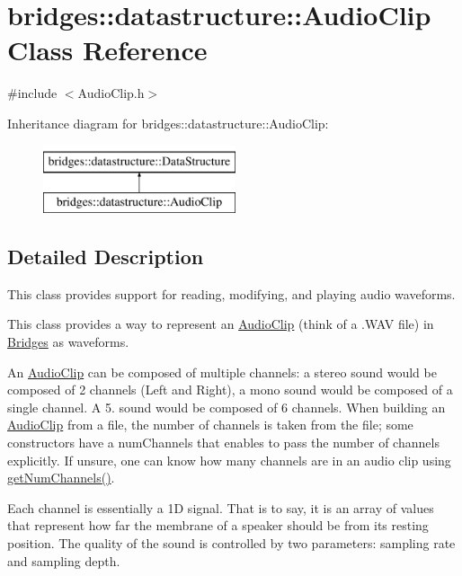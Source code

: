 \hypertarget{classbridges_1_1datastructure_1_1_audio_clip}{}\section{bridges\+:\+:datastructure\+:\+:Audio\+Clip Class Reference}
\label{classbridges_1_1datastructure_1_1_audio_clip}


{\ttfamily \#include $<$Audio\+Clip.\+h$>$}

Inheritance diagram for bridges\+:\+:datastructure\+:\+:Audio\+Clip\+:\begin{figure}[H]
\begin{center}
\leavevmode
\includegraphics[height=2.000000cm]{classbridges_1_1datastructure_1_1_audio_clip}
\end{center}
\end{figure}


\subsection{Detailed Description}
This class provides support for reading, modifying, and playing audio waveforms. 

This class provides a way to represent an \hyperlink{classbridges_1_1datastructure_1_1_audio_clip}{Audio\+Clip} (think of a .W\+AV file) in \hyperlink{classbridges_1_1_bridges}{Bridges} as waveforms.

An \hyperlink{classbridges_1_1datastructure_1_1_audio_clip}{Audio\+Clip} can be composed of multiple channels\+: a stereo sound would be composed of 2 channels (Left and Right), a mono sound would be composed of a single channel. A 5. sound would be composed of 6 channels. When building an \hyperlink{classbridges_1_1datastructure_1_1_audio_clip}{Audio\+Clip} from a file, the number of channels is taken from the file; some constructors have a num\+Channels that enables to pass the number of channels explicitly. If unsure, one can know how many channels are in an audio clip using \hyperlink{classbridges_1_1datastructure_1_1_audio_clip_acc378f797b1b6e3cfb778c1ccdc23dba}{get\+Num\+Channels()}.

Each channel is essentially a 1D signal. That is to say, it is an array of values that represent how far the membrane of a speaker should be from its resting position. The quality of the sound is controlled by two parameters\+: sampling rate and sampling depth.

